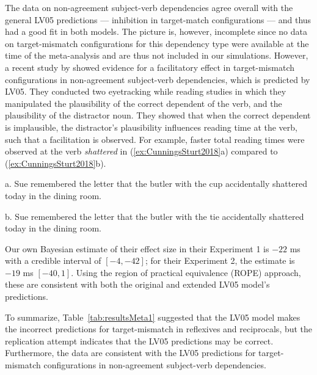 \documentclass{cambridge7A}\usepackage[]{graphicx}\usepackage[]{color}
\begin{document}
The data on non-agreement subject-verb dependencies agree overall with the general LV05 predictions --- inhibition in target-match configurations --- and thus had a good fit in both models. The picture is, however, incomplete since no data on target-mismatch configurations for this dependency type were available at the time of the \cite{JaegerEngelmannVasishth2017} meta-analysis and are thus not included in our simulations.
However, a recent study by \cite{CunningsSturt2018} showed evidence for a facilitatory effect in target-mismatch configurations in non-agreement subject-verb dependencies, which is predicted by LV05. 
They conducted two eyetracking while reading studies in which they manipulated the plausibility of the correct dependent of the verb, and the plausibility of the distractor noun. They showed that when the correct dependent is implausible, the distractor's plausibility influences reading time at the verb, such that a facilitation is observed. 
For example, faster total reading times were observed at the verb \textit{shattered} in (\ref{ex:CunningsSturt2018}a) compared to (\ref{ex:CunningsSturt2018}b). 

\begin{exe}
\ex\label{ex:CunningsSturt2018}
\begin{xlist}
\item[a.] Sue remembered the letter that the butler with the cup accidentally shattered today in the dining room. 
\item[b.] Sue remembered the letter that the butler with the tie accidentally shattered today in the dining room. 
\end{xlist}
\end{exe}

Our own Bayesian estimate of their effect size in their Experiment 1 is $-22$ ms with a credible interval of $[-4,-42]$; for their Experiment 2, the estimate is $-19$ ms $[-40,1]$. Using the   region of practical equivalence (ROPE) approach, these are consistent with both the original and extended LV05 model's predictions.

To summarize, Table~\ref{tab:resultsMeta1} suggested that the LV05 model makes the incorrect predictions for target-mismatch in reflexives and reciprocals, but the \cite{JaegerMertzenVanDykeVasishth2019} replication attempt indicates that the LV05 predictions may be correct. Furthermore, the \cite{CunningsSturt2018} data are consistent with the LV05 predictions for target-mismatch configurations in non-agreement subject-verb dependencies.
\end{document}
